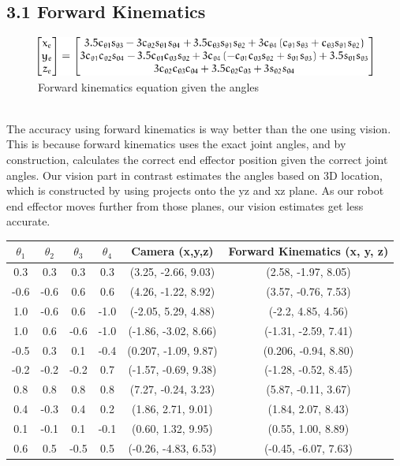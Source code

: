 

\subsection{3.1 Forward Kinematics}

\begin{figure}[ht]
\includegraphics[]{x_y_z.png}
\caption{Forward kinematics equation given the angles}
\end{figure}\\

The accuracy using forward kinematics is way better than the one using vision. This is because forward kinematics uses the exact joint angles, and by construction, calculates the correct end effector position given the correct joint angles. Our vision part in contrast estimates the angles based on 3D location, which is constructed by using projects onto the yz and xz plane. As our robot end effector moves further from those planes, our vision estimates get less accurate.
\begin{center}
\begin{tabular}{|c|c|c|c|c|c|}
\hline
$\theta_1 $ & $ \theta_2 $ & $ \theta_3 $ & $ \theta_4 $ & Camera (x,y,z) & Forward Kinematics (x, y, z) \\\hline
 0.3 & 0.3 & 0.3 & 0.3 & (3.25, -2.66, 9.03) & (2.58, -1.97, 8.05) \\ \hline
 -0.6 & -0.6 & 0.6 & 0.6 & (4.26, -1.22, 8.92) & (3.57, -0.76, 7.53) \\ \hline
 1.0 & -0.6 & 0.6 & -1.0 & (-2.05, 5.29, 4.88) & (-2.2, 4.85, 4.56) \\ \hline
 1.0 & 0.6 & -0.6 & -1.0 & (-1.86, -3.02, 8.66) & (-1.31, -2.59, 7.41) \\ \hline
 -0.5 & 0.3 & 0.1 & -0.4 & (0.207, -1.09, 9.87) & (0.206, -0.94, 8.80) \\ \hline
 -0.2 & -0.2 & -0.2 & 0.7 & (-1.57, -0.69, 9.38) & (-1.28, -0.52, 8.45) \\ \hline
 0.8 & 0.8 & 0.8 & 0.8 & (7.27, -0.24, 3.23) & (5.87, -0.11, 3.67) \\ \hline
 0.4 & -0.3 & 0.4 & 0.2 & (1.86, 2.71, 9.01) & (1.84, 2.07, 8.43) \\ \hline
 0.1 & -0.1 & 0.1 & -0.1 & (0.60, 1.32, 9.95) & (0.55, 1.00, 8.89) \\ \hline
 0.6 & 0.5 & -0.5 & 0.5 & (-0.26, -4.83, 6.53) & (-0.45, -6.07, 7.63) \\ \hline
\end{tabular}
\end{center}
